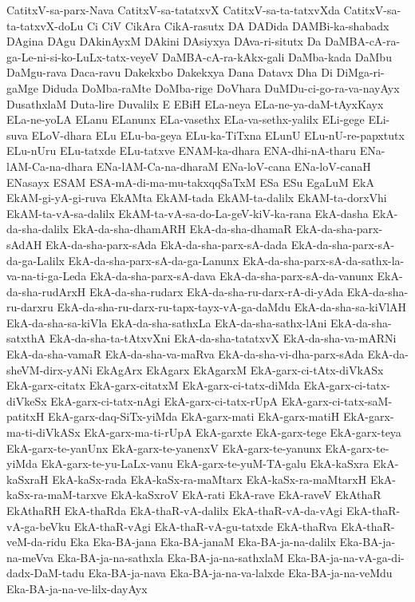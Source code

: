 {CatitxV-sa-parx-Nava
CatitxV-sa-tatatxvX
CatitxV-sa-ta-tatxvXda
CatitxV-sa-ta-tatxvX-doLu
Ci
CiV
CikAra
CikA-rasutx
DA
DADida
DAMBi-ka-shabadx
DAgina
DAgu
DAkinAyxM
DAkini
DAsiyxya
DAva-ri-situtx
Da
DaMBA-cA-ra-ga-Le-ni-si-ko-LuLx-tatx-veyeV
DaMBA-cA-ra-kAkx-gali
DaMba-kada
DaMbu
DaMgu-rava
Daca-ravu
Dakekxbo
Dakekxya
Dana
Datavx
Dha
Di
DiMga-ri-gaMge
Diduda
DoMba-raMte
DoMba-rige
DoVhara
DuMDu-ci-go-ra-va-nayAyx
DusathxlaM
Duta-lire
Duvalilx
E
EBiH
ELa-neya
ELa-ne-ya-daM-tAyxKayx
ELa-ne-yoLA
ELanu
ELanunx
ELa-vasethx
ELa-va-sethx-yalilx
ELi-gege
ELi-suva
ELoV-dhara
ELu
ELu-ba-geya
ELu-ka-TiTxna
ELunU
ELu-nU-re-papxtutx
ELu-nUru
ELu-tatxde
ELu-tatxve
ENAM-ka-dhara
ENA-dhi-nA-tharu
ENa-lAM-Ca-na-dhara
ENa-lAM-Ca-na-dharaM
ENa-loV-cana
ENa-loV-canaH
ENasayx
ESAM
ESA-mA-di-ma-mu-takxqqSaTxM
ESa
ESu
EgaLuM
EkA
EkAM-gi-yA-gi-ruva
EkAMta
EkAM-tada
EkAM-ta-dalilx
EkAM-ta-dorxVhi
EkAM-ta-vA-sa-dalilx
EkAM-ta-vA-sa-do-La-geV-kiV-ka-rana
EkA-dasha
EkA-da-sha-dalilx
EkA-da-sha-dhamARH
EkA-da-sha-dhamaR
EkA-da-sha-parx-sAdAH
EkA-da-sha-parx-sAda
EkA-da-sha-parx-sA-dada
EkA-da-sha-parx-sA-da-ga-Lalilx
EkA-da-sha-parx-sA-da-ga-Lanunx
EkA-da-sha-parx-sA-da-sathx-la-va-na-ti-ga-Leda
EkA-da-sha-parx-sA-dava
EkA-da-sha-parx-sA-da-vanunx
EkA-da-sha-rudArxH
EkA-da-sha-rudarx
EkA-da-sha-ru-darx-rA-di-yAda
EkA-da-sha-ru-darxru
EkA-da-sha-ru-darx-ru-tapx-tayx-vA-ga-daMdu
EkA-da-sha-sa-kiVlAH
EkA-da-sha-sa-kiVla
EkA-da-sha-sathxLa
EkA-da-sha-sathx-lAni
EkA-da-sha-satxthA
EkA-da-sha-ta-tAtxvXni
EkA-da-sha-tatatxvX
EkA-da-sha-va-mARNi
EkA-da-sha-vamaR
EkA-da-sha-va-maRva
EkA-da-sha-vi-dha-parx-sAda
EkA-da-sheVM-dirx-yANi
EkAgArx
EkAgarx
EkAgarxM
EkA-garx-ci-tAtx-diVkASx
EkA-garx-citatx
EkA-garx-citatxM
EkA-garx-ci-tatx-diMda
EkA-garx-ci-tatx-diVkeSx
EkA-garx-ci-tatx-nAgi
EkA-garx-ci-tatx-rUpA
EkA-garx-ci-tatx-saM-patitxH
EkA-garx-daq-SiTx-yiMda
EkA-garx-mati
EkA-garx-matiH
EkA-garx-ma-ti-diVkASx
EkA-garx-ma-ti-rUpA
EkA-garxte
EkA-garx-tege
EkA-garx-teya
EkA-garx-te-yanUnx
EkA-garx-te-yanenxV
EkA-garx-te-yanunx
EkA-garx-te-yiMda
EkA-garx-te-yu-LaLx-vanu
EkA-garx-te-yuM-TA-galu
EkA-kaSxra
EkA-kaSxraH
EkA-kaSx-rada
EkA-kaSx-ra-maMtarx
EkA-kaSx-ra-maMtarxH
EkA-kaSx-ra-maM-tarxve
EkA-kaSxroV
EkA-rati
EkA-rave
EkA-raveV
EkAthaR
EkAthaRH
EkA-thaRda
EkA-thaR-vA-dalilx
EkA-thaR-vA-da-vAgi
EkA-thaR-vA-ga-beVku
EkA-thaR-vAgi
EkA-thaR-vA-gu-tatxde
EkA-thaRva
EkA-thaR-veM-da-ridu
Eka
Eka-BA-jana
Eka-BA-janaM
Eka-BA-ja-na-dalilx
Eka-BA-ja-na-meVva
Eka-BA-ja-na-sathxla
Eka-BA-ja-na-sathxlaM
Eka-BA-ja-na-vA-ga-di-dadx-DaM-tadu
Eka-BA-ja-nava
Eka-BA-ja-na-va-lalxde
Eka-BA-ja-na-veMdu
Eka-BA-ja-na-ve-lilx-dayAyx
}

